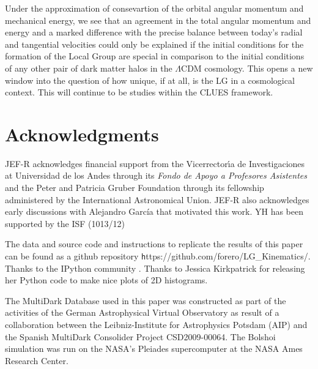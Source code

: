\documentclass{emulateapj}
\begin{document}
Under the approximation of consevartion of the orbital angular
momentum and mechanical energy, we see that an agreement in the total
angular momentum and energy and a marked difference with the precise
balance between today's radial and tangential velocities could only be
explained if the initial conditions for the formation of the Local
Group are special in comparison to the initial conditions of any other
pair of dark matter halos in the $\Lambda$CDM cosmology. This opens a
new window into the question of how unique, if at all, is the LG in a
cosmological context. This will continue to be studies within the
CLUES framework.


\label{sec:conclusions}
\section*{Acknowledgments}  
JEF-R acknowledges financial support from the Vicerrector\'{\i}a de
Investigaciones at Universidad de los Andes through its {\it Fondo de
  Apoyo a Profesores Asistentes} and the Peter and Patricia Gruber
Foundation through its fellowship administered by the International
Astronomical Union. JEF-R also acknowledges early discussions with
Alejandro Garc\'ia that motivated this work. YH has been supported by
the ISF (1013/12) 

The data and source code and instructions to replicate the results of
this paper can be found as a github repository {\texttt
  https://github.com/forero/LG\_Kinematics/}. Thanks to the IPython
community \citep{IPython}. Thanks to Jessica Kirkpatrick for releasing
her Python code to make nice plots of 2D histograms.  

The MultiDark Database used in this paper  was constructed as part of
the activities of the German Astrophysical Virtual Observatory as
result of a collaboration between the Leibniz-Institute for
Astrophysics Potsdam (AIP) and the Spanish MultiDark Consolider
Project CSD2009-00064. The Bolshoi simulation was run on the NASA's
Pleiades supercomputer at the NASA Ames Research Center. 



 
\end{document}
